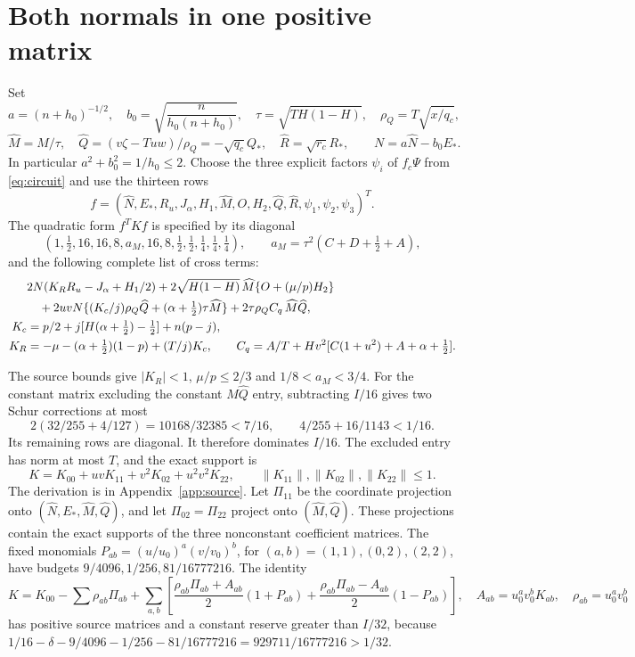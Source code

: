 \documentclass[10pt]{article}
\newcommand{\half}{\tfrac12}
\newcommand{\Qh}{Q_*}
\newcommand{\Rh}{R_*}
\newcommand{\Ps}{\Psi}
\begin{document}
\section{Both normals in one positive matrix}
Set
\[
 a=(n+h_0)^{-1/2},\quad
 b_0=\sqrt{\frac{n}{h_0(n+h_0)}},\quad
 \tau=\sqrt{TH(1-H)},\quad \rho_Q=T\sqrt{x/q_c},
\]
\[
 \widehat M=M/\tau,\quad
 \widehat Q=(v\zeta-Tuw)/\rho_Q=-\sqrt{q_c}\Qh,\quad
 \widehat R=\sqrt{r_c}\Rh,\qquad N=a\widehat N-b_0E_*.
\]
In particular $a^2+b_0^2=1/h_0\leq2$. Choose the three explicit factors
$\psi_i$ of $f_c\Ps$ from \eqref{eq:circuit} and use the thirteen rows
\[
 f=(\widehat N,E_*,R_u,J_\alpha,H_1,\widehat M,O,H_2,
                         \widehat Q,\widehat R,\psi_1,\psi_2,\psi_3)^T.
\]
The quadratic form $f^TKf$ is specified by its diagonal
\begin{equation}
 (1,\half,16,16,8,a_M,16,8,\half,\half,\tfrac14,\tfrac14,\tfrac14),
 \qquad a_M=\tau^2(C+D+\half+A),
 \label{eq:diag}
\end{equation}
and the following complete list of cross terms:
\begin{align}
 &2N(K_RR_u-J_\alpha+H_1/2)
 +2\sqrt{H(1-H)}\,\widehat M\{O+(\mu/p)H_2\}\notag\\
 &\quad+2uvN\{(K_c/j)\rho_Q\widehat Q
                         +(\alpha+\half)\tau\widehat M\}
 +2\tau\rho_Q C_q\,\widehat M\widehat Q, \label{eq:cross}\\
 K_c&=p/2+j[H(\alpha+\half)-\half]+n(p-j),\notag\\
 K_R&=-\mu-(\alpha+\half)(1-p)+(T/j)K_c,\qquad
 C_q=A/T+Hv^2[C(1+u^2)+A+\alpha+\half].\notag
\end{align}

The source bounds give $|K_R|<1$, $\mu/p\leq2/3$ and $1/8<a_M<3/4$.
For the constant matrix excluding the constant $\widehat M\widehat Q$
entry, subtracting $I/16$ gives two Schur corrections at most
\[
 2(32/255+4/127)=10168/32385<7/16,\qquad
 4/255+16/1143<1/16 .
\]
Its remaining rows are diagonal. It therefore dominates $I/16$.
The excluded entry has norm at most $T$, and the exact support is
\begin{equation}
 K=K_{00}+uvK_{11}+v^2K_{02}+u^2v^2K_{22},\qquad
 \|K_{11}\|,\|K_{02}\|,\|K_{22}\|\leq1.
 \label{eq:Kbounds}
\end{equation}
The derivation is in Appendix~\ref{app:source}.
Let $\Pi_{11}$ be the coordinate projection onto
$(\widehat N,E_*,\widehat M,\widehat Q)$, and let
$\Pi_{02}=\Pi_{22}$ project onto $(\widehat M,\widehat Q)$.
These projections contain the exact supports of the three nonconstant
coefficient matrices. The fixed monomials $P_{ab}=(u/u_0)^a(v/v_0)^b$, for
$(a,b)=(1,1),(0,2),(2,2)$, have budgets
$9/4096,1/256,81/16777216$. The identity
\[
 K=K_{00}-\sum\rho_{ab}\Pi_{ab}+
 \sum_{a,b}\left[
 \frac{\rho_{ab}\Pi_{ab}+A_{ab}}2(1+P_{ab})+
 \frac{\rho_{ab}\Pi_{ab}-A_{ab}}2(1-P_{ab})\right],
 \quad A_{ab}=u_0^av_0^bK_{ab},\quad\rho_{ab}=u_0^av_0^b
\]
has positive source matrices and a constant reserve greater than $I/32$,
because $1/16-\delta-9/4096-1/256-81/16777216=929711/16777216>1/32$.
\end{document}
